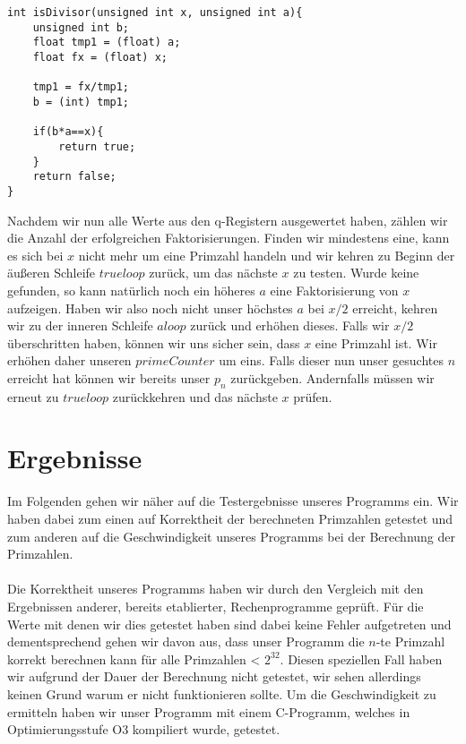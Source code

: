 \documentclass[11pt]{scrartcl}
\begin{document}
\begin{lstlisting}[frame=single, captionpos=b, label=code-comm-task, xleftmargin=.03\textwidth]
int isDivisor(unsigned int x, unsigned int a){
    unsigned int b;
    float tmp1 = (float) a;
    float fx = (float) x;
    
    tmp1 = fx/tmp1;
    b = (int) tmp1;
    
    if(b*a==x){
        return true;
    }
    return false;
}
\end{lstlisting}

Nachdem wir nun alle Werte aus den q-Registern ausgewertet haben, zählen wir die Anzahl der erfolgreichen Faktorisierungen. Finden wir mindestens eine, kann es sich bei $x$ nicht mehr um eine Primzahl handeln und wir kehren zu Beginn der äußeren Schleife $trueloop$ zurück, um das nächste $x$ zu testen. Wurde keine gefunden, so kann natürlich noch ein höheres $a$ eine Faktorisierung von $x$ aufzeigen. Haben wir also noch nicht unser höchstes $a$ bei $x/2$ erreicht, kehren wir zu der inneren Schleife $aloop$ zurück und erhöhen dieses. Falls wir $x/2$ überschritten haben, können wir uns sicher sein, dass $x$ eine Primzahl ist. Wir erhöhen daher unseren $primeCounter$ um eins. Falls dieser nun unser gesuchtes $n$ erreicht hat können wir bereits unser $p_n$ zurückgeben. Andernfalls müssen wir erneut zu $trueloop$ zurückkehren und das nächste $x$ prüfen.

\section{Ergebnisse}


Im Folgenden gehen wir näher auf die Testergebnisse unseres Programms ein. Wir haben dabei zum einen auf Korrektheit der berechneten Primzahlen getestet und zum anderen auf die Geschwindigkeit unseres Programms bei der Berechnung der Primzahlen.

\paragraph{}

Die Korrektheit unseres Programms haben wir durch den Vergleich mit den Ergebnissen anderer, bereits etablierter, Rechenprogramme \cite{WolframAlpha} geprüft. Für die Werte mit denen wir dies getestet haben sind dabei keine Fehler aufgetreten und dementsprechend gehen wir davon aus, dass unser Programm die $n$-te Primzahl korrekt berechnen kann für alle Primzahlen < $2^{32}$. Diesen speziellen Fall haben wir aufgrund der Dauer der Berechnung nicht getestet, wir sehen allerdings keinen Grund warum er nicht funktionieren sollte.
Um die Geschwindigkeit zu ermitteln haben wir unser Programm mit einem C-Programm, welches in Optimierungsstufe O3 kompiliert wurde, getestet.
\end{document}
